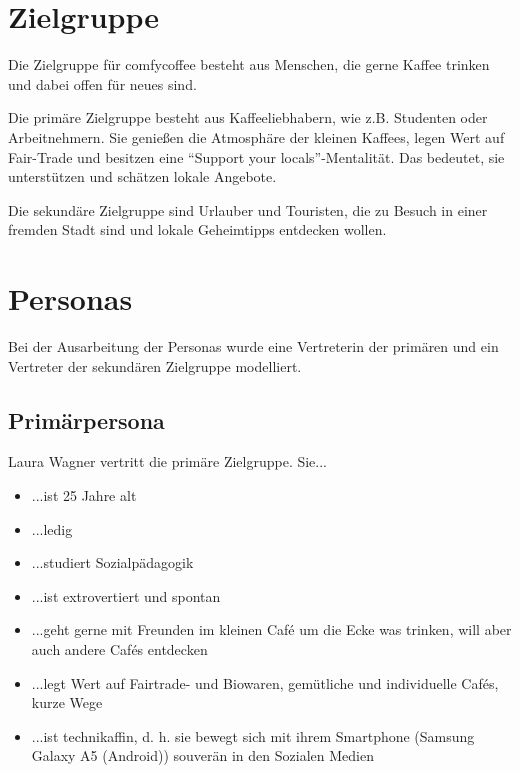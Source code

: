 \section{Zielgruppe}
Die Zielgruppe für comfycoffee besteht aus Menschen, die gerne Kaffee trinken und dabei offen für neues sind. 

Die primäre Zielgruppe besteht aus Kaffeeliebhabern, wie z.B. Studenten oder Arbeitnehmern. Sie genießen die Atmosphäre der kleinen Kaffees, legen Wert auf Fair-Trade und besitzen eine ``Support your locals''-Mentalität. Das bedeutet, sie unterstützen und schätzen lokale Angebote.

Die sekundäre Zielgruppe sind Urlauber und Touristen, die zu Besuch in einer fremden Stadt sind und lokale Geheimtipps entdecken wollen.

\section{Personas}
Bei der Ausarbeitung der Personas wurde eine Vertreterin der primären und ein Vertreter der sekundären Zielgruppe modelliert.

\subsection{Primärpersona}
Laura Wagner vertritt die primäre Zielgruppe. Sie...
\begin{itemize}
	\item ...ist 25 Jahre alt
	\item ...ledig
	\item ...studiert Sozialpädagogik
	\item ...ist extrovertiert und spontan
	\item ...geht gerne mit Freunden im kleinen Café um die Ecke was trinken, will aber auch andere Cafés entdecken
	\item ...legt Wert auf Fairtrade- und Biowaren, gemütliche und individuelle Cafés, kurze Wege
	\item ...ist technikaffin, d. h. sie bewegt sich mit ihrem Smartphone (Samsung Galaxy A5 (Android)) souverän in den Sozialen Medien
\end{itemize}

